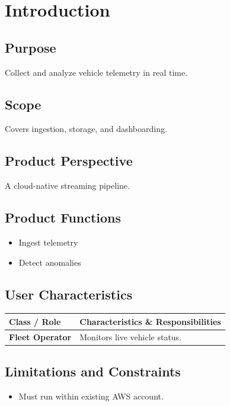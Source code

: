 \documentclass[11pt,a4paper]{article}
\begin{document}
\section{Introduction}
\subsection{Purpose}
Collect and analyze vehicle telemetry in real time.

\subsection{Scope}
Covers ingestion, storage, and dashboarding.

\subsection{Product Perspective}
A cloud-native streaming pipeline.

\subsection{Product Functions}
\begin{itemize}[leftmargin=*]
    \item Ingest telemetry
    \item Detect anomalies
\end{itemize}

\subsection{User Characteristics}
\begin{table}[h!]
\centering
\begin{tabularx}{\linewidth}{l X}
\toprule
\textbf{Class / Role} & \textbf{Characteristics \& Responsibilities} \\
\midrule
\textbf{Fleet Operator} & Monitors live vehicle status. \\
\bottomrule
\end{tabularx}
\end{table}

\subsection{Limitations and Constraints}
\begin{itemize}[leftmargin=*]
    \item Must run within existing AWS account.
\end{itemize}
\end{document}
